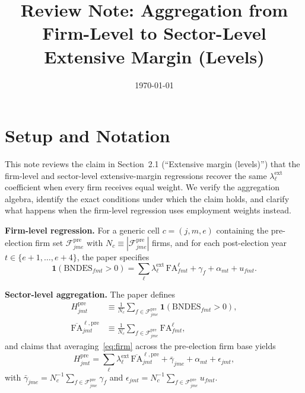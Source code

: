 \documentclass{article}
\newcommand{\FA}{\mathrm{FA}}
\newcommand{\ind}{\mathbf{1}}
\newcommand{\cFpre}{\mathcal{F}^{\mathrm{pre}}}
\theoremstyle{plain}
\begin{document}
\title{Review Note: Aggregation from Firm-Level to Sector-Level\\
Extensive Margin (Levels)}
\author{}
\date{\today}
\maketitle

\section{Setup and Notation}

This note reviews the claim in Section~2.1 (``Extensive margin (levels)'')
that the firm-level and sector-level extensive-margin regressions recover the
same $\lambda^\mathrm{ext}_\ell$ coefficient when every firm receives equal
weight.  We verify the aggregation algebra, identify the exact conditions under
which the claim holds, and clarify what happens when the firm-level regression
uses employment weights instead.

\medskip\noindent\textbf{Firm-level regression.}
For a generic cell $c = (j,m,e)$ containing the pre-election firm set
$\cFpre_{jme}$ with $N_c \equiv |\cFpre_{jme}|$ firms, and for each
post-election year $t \in \{e+1,\dots,e+4\}$, the paper specifies
\begin{equation}\label{eq:firm}
  \ind(\text{BNDES}_{fmt} > 0)
  = \sum_\ell \lambda^\mathrm{ext}_\ell\, \FA^\ell_{fmt}
  + \gamma_f + \alpha_{mt} + u_{fmt}.
\end{equation}

\noindent\textbf{Sector-level aggregation.}
The paper defines
\begin{align}
  H^\mathrm{pre}_{jmt}
  &\equiv \frac{1}{N_c}\sum_{f\in\cFpre_{jme}} \ind(\text{BNDES}_{fmt}>0),
  \label{eq:H}\\[4pt]
  \overline{\FA}^{\ell,\mathrm{pre}}_{jmt}
  &\equiv \frac{1}{N_c}\sum_{f\in\cFpre_{jme}} \FA^\ell_{fmt},
  \label{eq:FAbar}
\end{align}
and claims that averaging~\eqref{eq:firm} across the pre-election firm base
yields
\begin{equation}\label{eq:sector}
  H^\mathrm{pre}_{jmt}
  = \sum_\ell \lambda^\mathrm{ext}_\ell\,
    \overline{\FA}^{\ell,\mathrm{pre}}_{jmt}
  + \bar\gamma_{jme} + \alpha_{mt} + \epsilon_{jmt},
\end{equation}
with
$\bar\gamma_{jme} = N_c^{-1}\sum_{f\in\cFpre_{jme}}\gamma_f$
and
$\epsilon_{jmt} = N_c^{-1}\sum_{f\in\cFpre_{jme}} u_{fmt}$.
\end{document}
